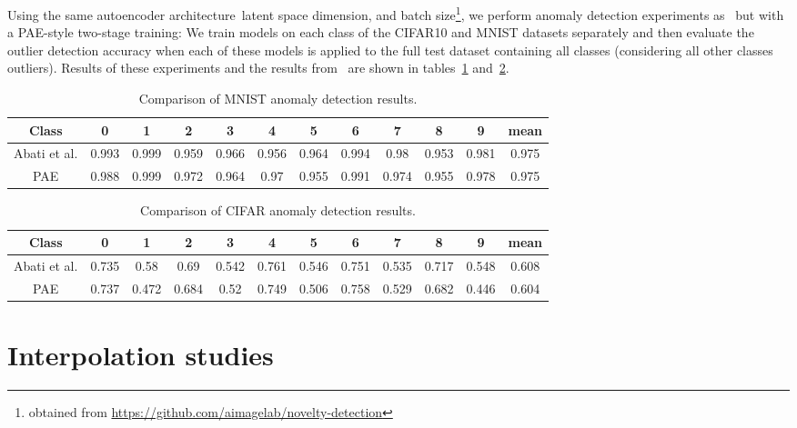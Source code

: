 \documentclass[10pt]{article} \usepackage[accepted]{tmlr}
\begin{document}
Using the same autoencoder architecture\, latent space dimension, and batch size\footnote{obtained from \url{https://github.com/aimagelab/novelty-detection}}, we perform anomaly detection experiments as~\citet{AbatiPCC19} but with a PAE-style two-stage training: We train models on each class of the CIFAR10 and MNIST datasets separately and then evaluate the outlier detection accuracy when each of these models is applied to the full test dataset containing all classes (considering all other classes outliers). Results of these experiments and the results from~\citet{AbatiPCC19} are shown in tables~\ref{tab:MNIST_results} and~\ref{tab:CIFAR_results}.

\begin{table}[!ht]
    \centering
    \begin{tabular}{c|c|c|c|c|c|c|c|c|c|c|c}
    \hline
        Class & 0 & 1 & 2 & 3 & 4 & 5 & 6 & 7 & 8 & 9 & mean \\ \hline
        Abati et al. & 0.993 & {0.999} & 0.959 & {0.966} & 0.956 & {0.964} & {0.994} & {0.98} & 0.953 & {0.981} & {0.975} \\ 
        PAE & 0.988 & {0.999} & {0.972} & 0.964 & {0.97} & 0.955 & 0.991 & 0.974 & {0.955} & 0.978 & {0.975}
    \end{tabular}
    \caption{\label{tab:MNIST_results} Comparison of MNIST anomaly detection results.}
\end{table}

\begin{table}[!ht]
    \centering
    \begin{tabular}{c|c|c|c|c|c|c|c|c|c|c|c}
    \hline
        Class & 0 & 1 & 2 & 3 & 4 & 5 & 6 & 7 & 8 & 9 & mean \\ \hline
        Abati et al. & 0.735 & 0.58 & 0.69 & 0.542 & 0.761 & 0.546 & 0.751 & 0.535 & 0.717 & 0.548 & 0.608\\ 
        PAE & {0.737} & 0.472 & 0.684 & 0.52 & 0.749 & 0.506 & 0.758 & 0.529 & 0.682 & 0.446 & 0.604 \\ 
    \end{tabular}
    \caption{\label{tab:CIFAR_results} Comparison of CIFAR anomaly detection results.}
\end{table}

\section{Interpolation studies}
\end{document}
